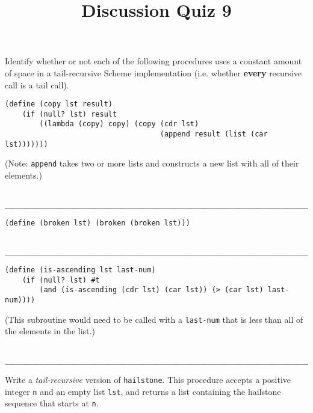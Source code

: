 \documentclass[twoside]{article}
\title{\sc Discussion Quiz 9 \solution{Solutions}}
\begin{document}
\thispagestyle{empty}
\maketitle

\begin{enumerate}

Identify whether or not each of the following procedures uses a constant amount of space in a tail-recursive Scheme implementation (i.e. whether \textbf{every} recursive call is a tail call).

\begin{lstlisting}
(define (copy lst result)
    (if (null? lst) result
        ((lambda (copy) copy) (copy (cdr lst)
                                    (append result (list (car lst)))))))
\end{lstlisting}

(Note: {\tt append} takes two or more lists and constructs a new list with all of their elements.)
\begin{lstlisting}

__________________________________________________________________________
\end{lstlisting}

\begin{lstlisting}
(define (broken lst) (broken (broken lst)))
\end{lstlisting}
\begin{lstlisting}

__________________________________________________________________________
\end{lstlisting}

\begin{lstlisting}
(define (is-ascending lst last-num)
    (if (null? lst) #t
        (and (is-ascending (cdr lst) (car lst)) (> (car lst) last-num))))
\end{lstlisting}

(This subroutine would need to be called with a {\tt last-num} that is less than all of the elements in the list.)
\begin{lstlisting}

__________________________________________________________________________
\end{lstlisting}


Write a \emph{tail-recursive} version of {\tt hailstone}. This procedure accepts a positive integer {\tt n} and an empty list {\tt lst}, and returns a list containing the hailstone sequence that starts at {\tt n}.


\end{enumerate}
\end{document}

